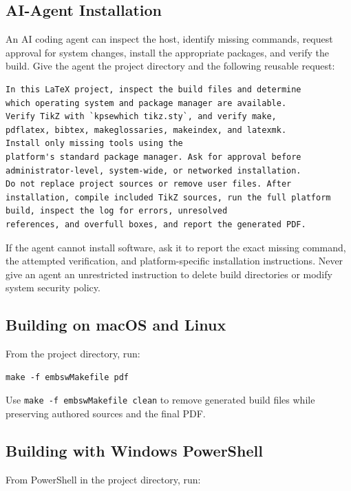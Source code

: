 \subsection{AI-Agent Installation}
\label{Section:AIAgentInstallation}

An AI coding agent can inspect the host, identify missing commands, request
approval for system changes, install the appropriate packages, and verify the
build. Give the agent the project directory and the following reusable request:

\begin{verbatim}
In this LaTeX project, inspect the build files and determine
which operating system and package manager are available.
Verify TikZ with `kpsewhich tikz.sty`, and verify make,
pdflatex, bibtex, makeglossaries, makeindex, and latexmk.
Install only missing tools using the
platform's standard package manager. Ask for approval before
administrator-level, system-wide, or networked installation.
Do not replace project sources or remove user files. After
installation, compile included TikZ sources, run the full platform
build, inspect the log for errors, unresolved
references, and overfull boxes, and report the generated PDF.
\end{verbatim}

If the agent cannot install software, ask it to report the exact missing
command, the attempted verification, and platform-specific installation
instructions. Never give an agent an unrestricted instruction to delete build
directories or modify system security policy.

\subsection{Building on macOS and Linux}

From the project directory, run:

\begin{verbatim}
make -f embswMakefile pdf
\end{verbatim}

Use \texttt{make -f embswMakefile clean} to remove generated build files while preserving authored sources and the final PDF.

\subsection{Building with Windows PowerShell}

From PowerShell in the project directory, run:

